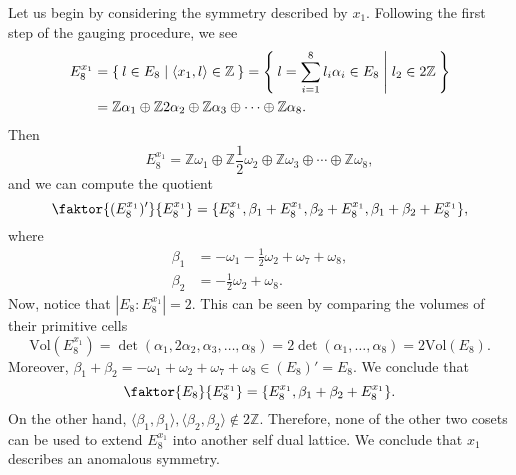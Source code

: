 \documentclass{article}
\begin{document}
Let us begin by considering the symmetry described by $x_1$. Following the first step of the gauging procedure, we see
\begin{equation}
    \begin{aligned}
    E_8^{x_1}&=\Set{l\in E_8|\langle x_1,l\rangle\in\mathbb{Z}}=\Set{l=\sum_{i=1}^8l_i\alpha_i\in E_8|l_2\in2\mathbb{Z}}\\
    &=\mathbb{Z}\alpha_1\oplus\mathbb{Z}2\alpha_2\oplus\mathbb{Z}\alpha_3\oplus\cdots\oplus\mathbb{Z}\alpha_8.
\end{aligned}
\end{equation}
Then
\begin{equation}
    E_8^{x_1}=\mathbb{Z}\omega_1\oplus\mathbb{Z}\frac{1}{2}\omega_2\oplus\mathbb{Z}\omega_3\oplus\cdots\oplus\mathbb{Z}\omega_8,
\end{equation}
and we can compute the quotient
\begin{equation}
    \faktor{(E_8^{x_1})'}{E_8^{x_1}}=\{E_8^{x_1},\beta_1+E_8^{x_1},\beta_2+E_8^{x_1},\beta_1+\beta_2+E_8^{x_1}\},
\end{equation}
where
\begin{equation}
    \begin{aligned}
    \beta_1&=-\omega_1-\frac{1}{2}\omega_2+\omega_7+\omega_8,\\
    \beta_2&=-\frac{1}{2}\omega_2+\omega_8.
    \end{aligned}
\end{equation}
Now, notice that $|E_8:E_8^{x_1}|=2$. This can be seen by comparing the volumes of their primitive cells
\begin{equation}
    \text{Vol}(E_8^{x_1})=\det(\alpha_1,2\alpha_2,\alpha_3,\dots,\alpha_8)=2\det(\alpha_1,\dots,\alpha_8)=2\text{Vol}(E_8).
\end{equation}
Moreover, $\beta_1+\beta_2=-\omega_1+\omega_2+\omega_7+\omega_8\in (E_8)'=E_8$. We conclude that
\begin{equation}
    \faktor{E_8}{E_8^{x_1}}=\{E_8^{x_1},\beta_1+\beta_2+E_8^{x_1}\}.
\end{equation}
On the other hand, $\langle\beta_1,\beta_1\rangle,\langle\beta_2,\beta_2\rangle\not\in2\mathbb{Z}$. Therefore, none of the other two cosets can be used to extend $E_8^{x_1}$ into another self dual lattice. We conclude that $x_1$ describes an anomalous symmetry.
\end{document}
